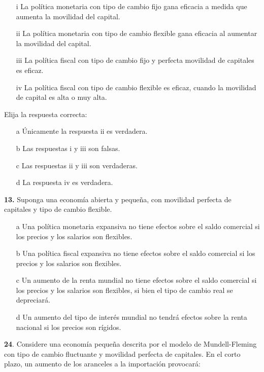 \documentclass{nuevotema}
\begin{document}
\begin{itemize}
	\item[i] La política monetaria con tipo de cambio fijo gana eficacia a medida que aumenta la movilidad del capital.
	\item[ii] La política monetaria con tipo de cambio flexible gana eficacia al aumentar la movilidad del capital.
	\item[iii] La política fiscal con tipo de cambio fijo y perfecta movilidad de capitales es eficaz.
	\item[iv] La política fiscal con tipo de cambio flexible es eficaz, cuando la movilidad de capital es alta o muy alta.
\end{itemize}

Elija la respuesta correcta:

\begin{itemize}
	\item[a] Únicamente la respuesta ii es verdadera.
	\item[b] Las respuestas i y iii son falsas.
	\item[c] Las respuestas ii y iii son verdaderas.
	\item[d] La respuesta iv es verdadera.
\end{itemize}


\textbf{13.} Suponga una economía abierta y pequeña, con movilidad perfecta de capitales y tipo de cambio flexible.

\begin{itemize}
	\item[a] Una política monetaria expansiva no tiene efectos sobre el saldo comercial si los precios y los salarios son flexibles.
	\item[b] Una política fiscal expansiva no tiene efectos sobre el saldo comercial si los precios y los salarios son flexibles.
	\item[c] Un aumento de la renta mundial no tiene efectos sobre el saldo comercial si los precios y los salarios son flexibles, si bien el tipo de cambio real se depreciará.
	\item[d] Un aumento del tipo de interés mundial no tendrá efectos sobre la renta nacional si los precios son rígidos.
\end{itemize}


\textbf{24}. Considere una economía pequeña descrita por el modelo de Mundell-Fleming con tipo de cambio fluctuante y movilidad perfecta de capitales. En el corto plazo, un aumento de los aranceles a la importación provocará:
\end{document}
